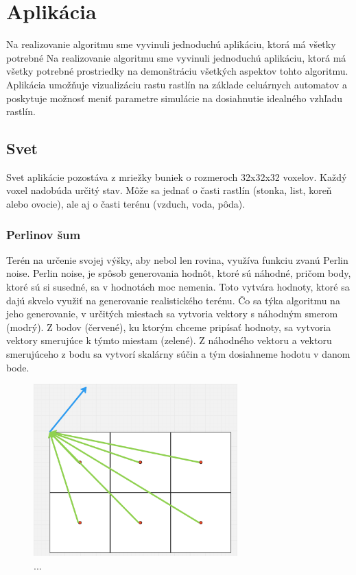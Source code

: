 \documentclass[12pt]{article}
\begin{document}
\section{Aplikácia}

Na realizovanie algoritmu sme vyvinuli jednoduchú aplikáciu, ktorá má všetky
potrebné Na realizovanie algoritmu sme vyvinuli jednoduchú aplikáciu, ktorá má
všetky potrebné prostriedky na demonštráciu všetkých aspektov tohto algoritmu.
Aplikácia umožňuje vizualizáciu rastu rastlín na základe celuárnych automatov
a poskytuje možnosť meniť parametre simulácie na dosiahnutie idealného vzhľadu
rastlín.

\subsection{Svet}

Svet aplikácie pozostáva z mriežky buniek o rozmeroch 32x32x32 voxelov.
Každý voxel nadobúda určitý stav. Môže sa jednať o časti rastlín (stonka, list,
koreň alebo ovocie), ale aj o časti terénu (vzduch, voda, pôda).

\subsubsection{Perlinov šum}

Terén na určenie svojej výšky, aby nebol len rovina, využíva funkciu zvanú
Perlin noise. Perlin noise, je spôsob generovania hodnôt, ktoré sú náhodné,
pričom body, ktoré sú si susedné, sa v hodnotách moc nemenia. Toto vytvára
hodnoty, ktoré sa dajú skvelo využiť na generovanie realistického terénu.
Čo sa týka algoritmu na jeho generovanie, v určitých miestach sa vytvoria
vektory s náhodným smerom (modrý). Z bodov (červené), ku ktorým chceme pripísať
hodnoty, sa vytvoria vektory smerujúce k týmto miestam (zelené). Z náhodného
vektoru a vektoru smerujúceho z bodu sa vytvorí skalárny súčin a tým dosiahneme
hodotu v danom bode.

\begin{figure}
	\centering
	\includegraphics[width=0.7\textwidth]{res/prelinov_sum.png}
	\caption{...}
	\label{obr:perlinov sum}
\end{figure}
\end{document}
